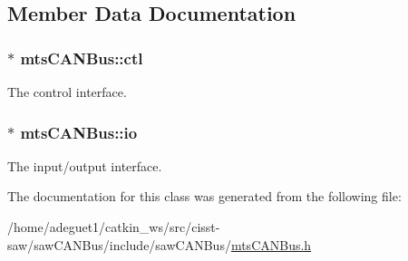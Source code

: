 \subsection{Member Data Documentation}
\hypertarget{classmts_c_a_n_bus_ae87e117a52479bae3ec4464f2448e8c2}{
\subsubsection[{ctl}]{$\ast$ mts\-C\-A\-N\-Bus\-::ctl\hspace{0.3cm}{\ttfamily [protected]}}}\label{classmts_c_a_n_bus_ae87e117a52479bae3ec4464f2448e8c2}


The control interface. 

\hypertarget{classmts_c_a_n_bus_a273a160e43d6b59b9f451c7ef8c1f93e}{
\subsubsection[{io}]{$\ast$ mts\-C\-A\-N\-Bus\-::io\hspace{0.3cm}{\ttfamily [protected]}}}\label{classmts_c_a_n_bus_a273a160e43d6b59b9f451c7ef8c1f93e}


The input/output interface. 



The documentation for this class was generated from the following file\-:\begin{DoxyCompactItemize}
\item 
/home/adeguet1/catkin\-\_\-ws/src/cisst-\/saw/saw\-C\-A\-N\-Bus/include/saw\-C\-A\-N\-Bus/\hyperlink{mts_c_a_n_bus_8h}{mts\-C\-A\-N\-Bus.\-h}\end{DoxyCompactItemize}
